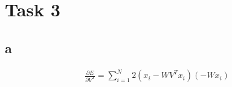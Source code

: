 \section*{Task 3}

\subsection*{a}

\begin{gather*}
\frac{\partial E}{\partial V^T} = \sum^N_{i=1} 2(x_i - W V^T x_i) (-W x_i) \\
\end{gather*}


